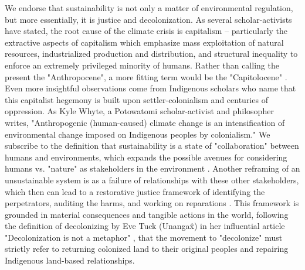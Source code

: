 \documentclass[manuscript,review,anonymous]{acmart}
\begin{document}
We endorse that sustainability is not only a matter of environmental regulation, but more essentially, it is justice and decolonization. As several scholar-activists have stated, the root cause of the climate crisis is capitalism -- particularly the extractive aspects of capitalism which emphasize mass exploitation of natural resources, industrialized production and distribution, and structural inequality to enforce an extremely privileged minority of humans. Rather than calling the present the "Anthropocene", a more fitting term would be the "Capitolocene" \cite{haraway_staying_2016, sze_environmental_2020}. Even more insightful observations come from Indigenous scholars who name that this capitalist hegemony is built upon settler-colonialism and centuries of oppression. As Kyle Whyte, a Potowatomi scholar-activist and philosopher writes, "Anthropogenic (human-caused) climate change is an intensification of environmental change imposed on Indigenous peoples by colonialism." \cite{whyte_weaving_2016} We subscribe to the definition that sustainability is a state of "collaboration" between humans and environments, which expands the possible avenues for considering  humans vs. "nature" as stakeholders in the environment \cite{kimmerer_braiding_2015, tallbear_standing_2014}.
Another reframing of an 
unsustainable system is as a failure of relationships with these other stakeholders, which then can lead to a restorative justice framework of identifying the perpetrators, auditing the harms, and working on reparations \cite{whyte_indigenous_2017}.
This framework is grounded in material consequences and tangible actions in the world, following the definition of decolonizing by Eve Tuck (Unanga\^{x}) in her influential article "Decolonization is not a metaphor" \cite{tuck_decolonization_2012}
, that the movement to "decolonize"  must strictly refer to returning colonized land to their original peoples and repairing Indigenous land-based relationships.
\end{document}
